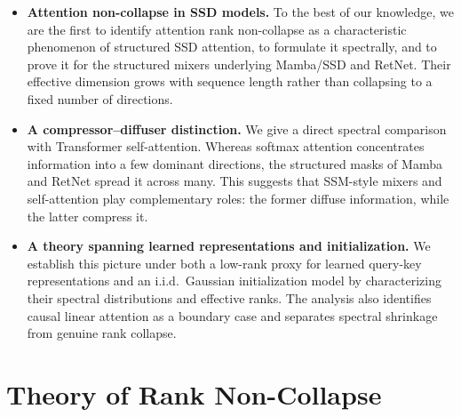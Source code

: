 \documentclass{article}
\theoremstyle{definition}
\theoremstyle{remark}
\begin{document}
\begin{itemize}
    \item \textbf{Attention non-collapse in SSD models.}  To the best of our
    knowledge, we are the first to identify attention rank non-collapse as a
    characteristic phenomenon of structured SSD attention, to formulate it
    spectrally, and to prove it for the structured mixers underlying Mamba/SSD
    and RetNet.  Their effective dimension grows with sequence length rather
    than collapsing to a fixed number of directions.

    \item \textbf{A compressor--diffuser distinction.}  We give a direct
    spectral comparison with Transformer self-attention.  Whereas softmax
    attention concentrates information into a few dominant directions, the
    structured masks of Mamba and RetNet spread it across many.  This suggests
    that SSM-style mixers and self-attention play complementary roles: the
    former diffuse information, while the latter compress it.

    \item \textbf{A theory spanning learned representations and
    initialization.}  We establish this picture under both a low-rank proxy
    for learned query-key representations and an i.i.d.\ Gaussian initialization
    model by characterizing their spectral distributions and effective ranks.
    The analysis also identifies causal linear attention as a boundary case
    and separates spectral shrinkage from genuine rank collapse.
\end{itemize}

\section{Theory of Rank Non-Collapse}
\end{document}
